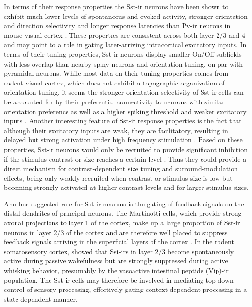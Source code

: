 In terms of their response properties the Sst-ir neurons have been
shown to exhibit much lower levels of spontaneous and evoked activity,
stronger orientation and direction selectivity and longer response
latencies than Pv-ir neurons in mouse visual cortex
\citep{Ma2011}. These properties are consistent across both layer 2/3
and 4 and may point to a role in gating later-arriving intracortical
excitatory inputs. In terms of their tuning properties, Sst-ir neurons
display smaller On/Off subfields with less overlap than nearby spiny
neurons and orientation tuning, on par with pyramidal neurons. While
most data on their tuning properties comes from rodent visual cortex,
which does not exhibit a topographic organization of orientation
tuning, it seems the stronger orientation selectivity of Sst-ir cells
can be accounted for by their preferential connectivity to neurons
with similar orientation preference as well as a higher spiking
threshold and weaker excitatory inputs \citep{Bartley2008}. Another
interesting feature of Sst-ir response properties is the fact that
although their excitatory inputs are weak, they are facilitatory,
resulting in delayed but strong activation under high frequency
stimulation \citep{Beierlein2003,Bartley2008,Tan2008}. Based on these
properties, Sst-ir neurons would only be recruited to provide
significant inhibition if the stimulus contrast or size reaches a
certain level \citep{Adesnik2012}. Thus they could provide a direct
mechanism for contrast-dependent size tuning and surround-modulation
effects, being only weakly recruited when contrast or stimulus size is
low but becoming strongly activated at higher contrast levels and for
larger stimulus sizes.

Another suggested role for Sst-ir neurons is the gating of feedback
signals on the distal dendrites of principal neurons. The Martinotti
cells, which provide strong axonal projections to layer 1 of the
cortex, make up a large proportion of Sst-ir neurons in layer 2/3 of
the cortex and are therefore well placed to suppress feedback signals
arriving in the superficial layers of the cortex
\citep{Fanselow2008,Gentet2012}. In the rodent somatosensory cortex,
\cite{Gentet2012} showed that Sst-irs in layer 2/3 become
spontaneously active during passive wakefulness but are strongly
suppressed during active whisking behavior, presumably by the
vasoactive intestinal peptide (Vip)-ir population. The Sst-ir cells
may therefore be involved in mediating top-down control of sensory
processing, effectively gating context-dependent processing in a state
dependent manner.

